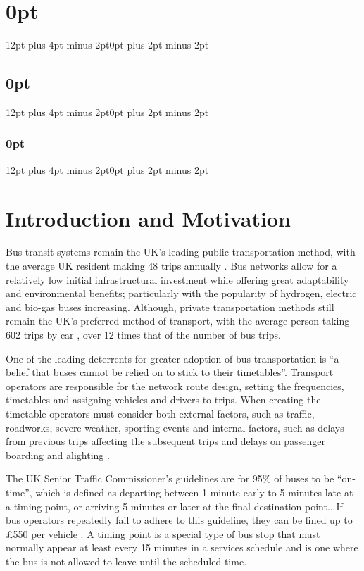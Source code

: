 \documentclass{article}
\begin{document}
\newpage

\setcounter{page}{1}

\titlespacing\section{0pt}{12pt plus 4pt minus 2pt}{0pt plus 2pt minus 2pt}
\titlespacing\subsection{0pt}{12pt plus 4pt minus 2pt}{0pt plus 2pt minus 2pt}
\titlespacing\subsubsection{0pt}{12pt plus 4pt minus 2pt}{0pt plus 2pt minus 2pt}
\setlength{\parindent}{2em}
\setlength{\parskip}{1em}
\setlength{\belowcaptionskip}{-10pt}


\section{Introduction and Motivation}


Bus transit systems remain the UK's leading public transportation method, with the average UK resident making 48 trips annually \cite{RN9}. Bus networks allow for a relatively low initial infrastructural investment while offering great adaptability and environmental benefits; particularly with the popularity of hydrogen, electric and bio-gas buses increasing. Although, private transportation methods still remain the UK's preferred method of transport, with the average person taking 602 trips by car \cite{RN9}, over 12 times that of the number of bus trips. 

\par
One of the leading deterrents for greater adoption of bus transportation is ``a belief that buses cannot be relied on to stick to their timetables''\cite{RN10}. Transport operators are responsible for the network route design, setting the frequencies, timetables and assigning vehicles and drivers to trips. When creating the timetable operators must consider both external factors, such as traffic, roadworks, severe weather, sporting events and internal factors, such as delays from previous trips affecting the subsequent trips and delays on passenger boarding and alighting \cite{RN11}.

\par
The UK Senior Traffic Commissioner's guidelines are for 95\% of buses to be ``on-time'', which is defined as departing between 1 minute early to 5 minutes late at a timing point, or arriving 5 minutes or later at the final destination point.\cite{RN14}. If bus operators repeatedly fail to adhere to this guideline, they can be fined up to £550 per vehicle \cite{RN14}.  A timing point is a special type of bus stop that must normally appear at least every 15 minutes in a services schedule and is one where the bus is not allowed to leave until the scheduled time.
\end{document}
